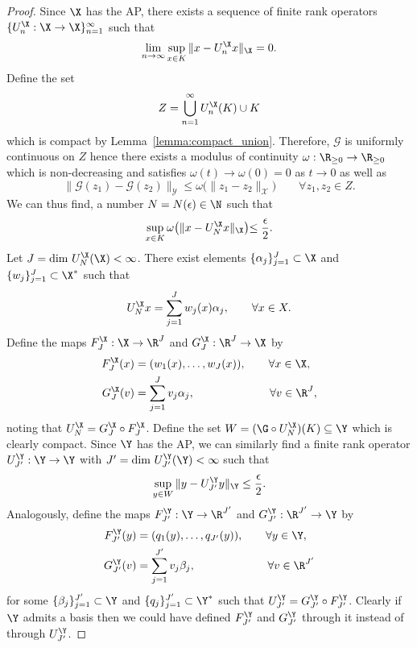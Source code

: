 \begin{proof}
Since \(\X\) has the AP, there exists a sequence of finite rank operators \(\{U^{\X}_n : \X \to \X\}_{n=1}^\infty\) such that
\[\lim_{n \to \infty} \sup_{x \in K} \|x - U^{\X}_n x\|_\X = 0.\]
Define the set 
\[Z = \bigcup_{n=1}^\infty U^{\X}_n(K) \cup K\]
which is compact by Lemma~\ref{lemma:compact_union}. Therefore, \(\mathcal{G}\) is uniformly continuous on \(Z\) hence 
there exists a modulus of continuity \(\omega : \R_{\geq 0} \to \R_{\geq 0}\) which is non-decreasing 
and satisfies \(\omega(t) \to \omega(0) = 0\) as \(t \to 0\) as well as 
\[\|\mathcal{G}(z_1) - \mathcal{G}(z_2)\|_{\mathcal{Y}} \leq \omega \bigl( \|z_1 - z_2\|_\mathcal{X} \bigl ) \qquad \forall z_1, z_2 \in Z.\]
We can thus find, a number \(N = N(\epsilon) \in \N\) such that
\[\sup_{x \in K} \omega \bigl ( \|x - U^{\X}_N x \|_{\X} \bigl ) \leq \frac{\epsilon}{2}. \]
Let \(J = \text{dim } U^{\X}_N (\X) < \infty\). There exist elements \(\{\alpha_j\}_{j=1}^J \subset \X\) and \(\{w_j\}_{j=1}^J \subset \X^*\)
such that
\[U^{\X}_N x = \sum_{j=1}^J w_j(x) \alpha_j, \qquad \forall x \in X.\]
Define the maps \(F^{\X}_J : \X \to \R^{J}\) and \(G^{\X}_J : \R^{J} \to \X\) by
\begin{align*}
F^{\X}_J(x) &= (w_1(x), \hdots, w_J(x)), \qquad \forall  x \in \X, \\
G^{\X}_J (v) &= \sum_{j=1}^J v_j \alpha_j, \qquad \qquad \qquad \:\:\:  \forall v \in \R^J,
\end{align*}
noting that \(U^{\X}_N = G^{\X}_J \circ F^{\X}_J\). Define the set \(W = (\G \circ U^{\X}_N)(K) \subseteq \Y\) which is clearly compact.
Since \(\Y\) has the AP, we can similarly find a finite rank operator \(U^{\Y}_{J'} : \Y \to \Y\) with \(J' = \text{dim } U^{\Y}_{J'} (\Y) < \infty\)
such that
\[\sup_{y \in W} \|y - U^{\Y}_{J'} y \|_{\Y} \leq \frac{\epsilon}{2}.\]
Analogously, define the maps \(F^{\Y}_{J'} : \Y \to \R^{J'}\) and \(G^{\Y}_{J'} : \R^{J'} \to \Y\) by 
\begin{align*}
F^{\Y}_{J'}(y) &= (q_1(y), \hdots, q_{J'}(y)), \qquad \forall y \in \Y, \\
G^{\Y}_{J'} (v) &= \sum_{j=1}^{J'} v_j \beta_j, \qquad \qquad \qquad \:\:  \forall v \in \R^{J'}
\end{align*}
for some \(\{\beta_j\}_{j=1}^{J'} \subset \Y\) and \(\{q_j\}_{j=1}^{J'} \subset \Y^*\) such that \(U^{\Y}_{J'} = G^{\Y}_{J'} \circ F^{\Y}_{J'}\).
Clearly if \(\Y\) admits a basis then we could have defined \(F^{\Y}_{J'}\) and \(G^{\Y}_{J'}\) through it instead 
of through \(U^{\Y}_{J'}\).

\end{proof}
